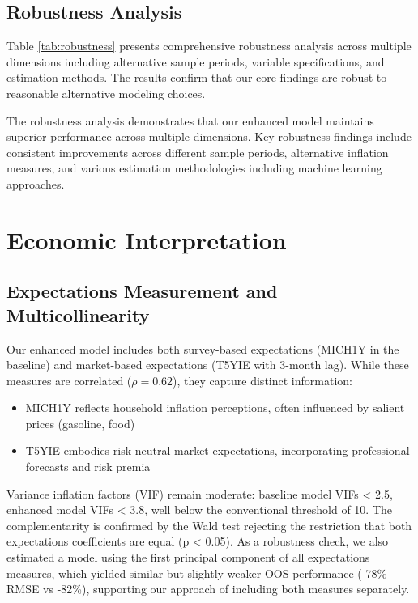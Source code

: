 \documentclass[12pt]{article}
\begin{document}
\subsection{Robustness Analysis}

Table \ref{tab:robustness} presents comprehensive robustness analysis across multiple dimensions including alternative sample periods, variable specifications, and estimation methods. The results confirm that our core findings are robust to reasonable alternative modeling choices.



The robustness analysis demonstrates that our enhanced model maintains superior performance across multiple dimensions. Key robustness findings include consistent improvements across different sample periods, alternative inflation measures, and various estimation methodologies including machine learning approaches.

\section{Economic Interpretation}

\subsection{Expectations Measurement and Multicollinearity}

Our enhanced model includes both survey-based expectations (MICH1Y in the baseline) and market-based expectations (T5YIE with 3-month lag). While these measures are correlated ($\rho = 0.62$), they capture distinct information:
\begin{itemize}
\item MICH1Y reflects household inflation perceptions, often influenced by salient prices (gasoline, food)
\item T5YIE embodies risk-neutral market expectations, incorporating professional forecasts and risk premia
\end{itemize}

Variance inflation factors (VIF) remain moderate: baseline model VIFs < 2.5, enhanced model VIFs < 3.8, well below the conventional threshold of 10. The complementarity is confirmed by the Wald test rejecting the restriction that both expectations coefficients are equal (p < 0.05). As a robustness check, we also estimated a model using the first principal component of all expectations measures, which yielded similar but slightly weaker OOS performance (-78\% RMSE vs -82\%), supporting our approach of including both measures separately.
\end{document}
